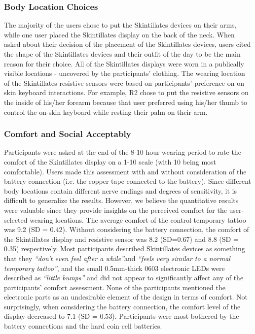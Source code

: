 \documentclass{sigchi}
\begin{document}
\subsubsection{Body Location Choices}
The majority of the users chose to put the Skintillates devices on their arms, while one user placed the Skintillates display on the back of the neck. When asked about their decision of the placement of the Skintillates devices, users cited the shape of the Skintillates devices and their outfit of the day to be the main reason for their choice. All of the Skintillates displays were worn in a publically visible locations - uncovered by the participants’ clothing. The wearing location of the Skintillates resistive sensors were based on participants’ preference on on-skin keyboard interactions. For example, R2 chose to put the resistive sensors on the inside of his/her forearm because that user preferred using his/her thumb to control the on-skin keyboard while resting their palm on their arm. 
\subsubsection{Comfort and Social Acceptably}
Participants were asked at the end of the 8-10 hour wearing period to rate the comfort of the Skintillates display on a 1-10 scale (with 10 being most comfortable).  Users made this assessment with and without consideration of the battery connection (i.e. the copper tape connected to the battery). Since different body locations contain different nerve endings and degrees of sensitivity, it is difficult to generalize the results.  However, we believe the quantitative results were valuable since they provide insights on the perceived comfort for the user-selected wearing locations. 
The average comfort of the control temporary tattoo was 9.2 (SD = 0.42). Without considering the battery connection, the comfort of the Skintillates display and resistive sensor was 8.2 (SD=0.67) and 8.8 (SD = 0.35) respectively. Most participants described Skintillates devices as something that they \textit{“don’t even feel after a while”}and \textit{“feels very similar to a normal temporary tattoo”}, and the small 0.5mm-thick 0603 electronic LEDs were described as \textit{“little bumps”} and did not appear to significantly affect any of the participants' comfort assessment.  None of the participants mentioned the electronic parts as an undesirable element of the design in terms of comfort.
Not surprisingly, when considering the battery connection, the comfort level of the display decreased to 7.1 (SD = 0.53). Participants were most bothered by the battery connections and the hard coin cell batteries. 
\end{document}
